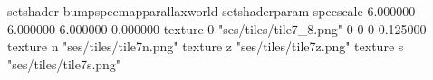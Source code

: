 setshader bumpspecmapparallaxworld
setshaderparam specscale 6.000000 6.000000 6.000000 0.000000
texture 0 "ses/tiles/tile7_8.png" 0 0 0 0.125000
texture n "ses/tiles/tile7n.png"
texture z "ses/tiles/tile7z.png"
texture s "ses/tiles/tile7s.png"

